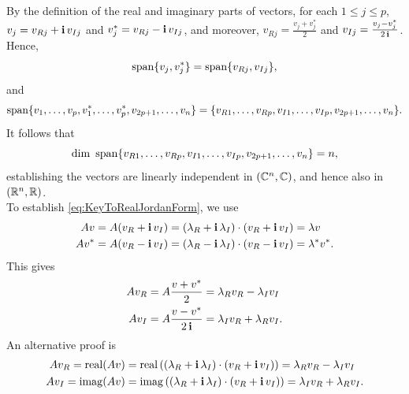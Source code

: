 By the definition of the real and imaginary parts of vectors, for each $1 \le j \le p$, $v_j = v_{Rj} + \mathop{\bm{\mathrm i}} v_{Ij}$ and $v_j^\ast = v_{Rj} - \mathop{\bm{\mathrm i}} v_{Ij}$, and moreover, 
$ v_{Rj} = \frac{v_j + v_j^\ast}{2}$ and $v_{Ij} = \frac{v_j - v_j^\ast}{2 \mathop{\bm{\mathrm i}}}$. Hence, 
$$ \mathrm{span} \{ v_j, v_j^\ast \} =  \mathrm{span} \{ v_{Rj}, v_{Ij} \}, $$
and 
$$\mathrm{span} \{ v_1, \ldots, v_p, v_1^\ast, \ldots, v_p^\ast, v_{2p+1}, \ldots, v_n \} =  \{ v_{R1}, \ldots, v_{Rp},v_{I1}, \ldots, v_{Ip} , v_{2p+1}, \ldots, v_n \}.$$
It follows that
 $$\dim ~ \mathrm{span} \{ v_{R1}, \ldots, v_{Rp},v_{I1}, \ldots, v_{Ip} , v_{2p+1}, \ldots, v_n \} = n,$$
 establishing the vectors are linearly independent in $(\mathbb C^n, \mathbb C)$, and hence also in $(\mathbb R^n, \mathbb R)$.\\

 To establish \eqref{eq:KeyToRealJordanForm}, we use 
 \begin{align*}
  A v =    A (v_R + \mathop{\bm{\mathrm i}} v_I) & = (\lambda_R + \mathop{\bm{\mathrm i}} \lambda_I) \cdot (v_R + \mathop{\bm{\mathrm i}} v_I) = \lambda v\\
  A v^\ast=    A (v_R - \mathop{\bm{\mathrm i}} v_I) & = (\lambda_R - \mathop{\bm{\mathrm i}} \lambda_I) \cdot (v_R - \mathop{\bm{\mathrm i}} v_I) = \lambda^\ast v^\ast.
 \end{align*}
 This gives 
  \begin{align*}
  Av_R =    A  \frac{v + v^\ast}{2} & = \lambda_R v_R -  \lambda_I v_I \\
  Av_I =    A  \frac{v - v^\ast}{2 \mathop{\bm{\mathrm i}}} & = \lambda_I v_R +  \lambda_R v_I.
 \end{align*}
 An alternative proof is
   \begin{align*}
  Av_R =    {\rm real}(A v)& = {\rm real}\left( (\lambda_R + \mathop{\bm{\mathrm i}} \lambda_I) \cdot (v_R + \mathop{\bm{\mathrm i}} v_I) \right) = \lambda_R v_R -  \lambda_I v_I \\
  Av_I =    {\rm imag}(A v) & = {\rm imag}\left((\lambda_R + \mathop{\bm{\mathrm i}} \lambda_I) \cdot (v_R + \mathop{\bm{\mathrm i}} v_I)\right) = \lambda_I v_R +  \lambda_R v_I.
 \end{align*}

 
 \Qed

 \bigskip


